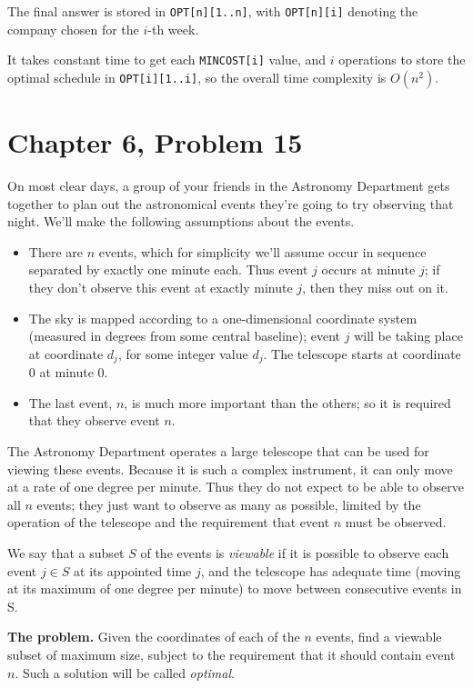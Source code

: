 \documentclass[12pt,letterpaper]{article}
\begin{document}
The final answer is stored in \texttt{OPT[n][1..n]}, with \texttt{OPT[n][i]} denoting the company chosen for the $i$-th week.

It takes constant time to get each \texttt{MINCOST[i]} value, and $i$ operations to store the optimal schedule in \texttt{OPT[i][1..i]}, so the overall time complexity is $O(n^2)$.

\section*{Chapter 6, Problem 15}
On most clear days, a group of your friends in the Astronomy Department
gets together to plan out the astronomical events they're going to try
observing that night. We'll make the following assumptions about the
events.
\begin{itemize}
\item There are $n$ events, which for simplicity we'll assume occur in sequence
separated by exactly one minute each. Thus event $j$ occurs
at minute $j$; if they don't observe this event at exactly minute $j$, then
they miss out on it.
\item The sky is mapped according to a one-dimensional coordinate system
(measured in degrees from some central baseline); event $j$ will be
taking place at coordinate $d_j$, for some integer value $d_j$. The telescope
starts at coordinate 0 at minute 0.
\item The last event, $n$, is much more important than the others; so it is
required that they observe event $n$.
\end{itemize}

The Astronomy Department operates a large telescope that can be
used for viewing these events. Because it is such a complex instrument, it
can only move at a rate of one degree per minute. Thus they do not expect
to be able to observe all $n$ events; they just want to observe as many as
possible, limited by the operation of the telescope and the requirement
that event $n$ must be observed.

We say that a subset $S$ of the events is \emph{viewable} if it is possible to
observe each event $j \in S$ at its appointed time $j$, and the telescope has
adequate time (moving at its maximum of one degree per minute) to move
between consecutive events in S.

\textbf{The problem.} Given the coordinates of each of the $n$ events, find a
viewable subset of maximum size, subject to the requirement that it
should contain event $n$. Such a solution will be called \emph{optimal}.
\end{document}
